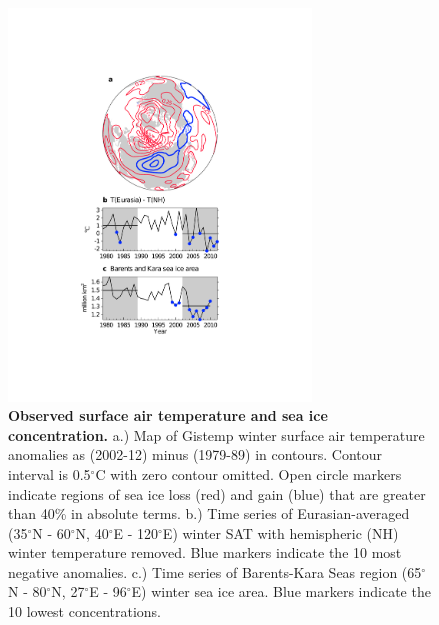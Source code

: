 \documentclass{nature}
\begin{document}
\begin{figure}%
\centering
\noindent\includegraphics[width=19pc]{Figure1.pdf}
\caption{\textbf{Observed surface air temperature and sea ice concentration.} a.) Map of Gistemp winter surface air temperature anomalies as (2002-12) minus (1979-89) in contours. Contour interval is 0.5$^\circ$C with zero contour omitted. Open circle markers indicate regions of sea ice loss (red) and gain (blue) that are greater than 40\% in absolute terms. b.) Time series of Eurasian-averaged (35$^\circ$N - 60$^\circ$N, 40$^\circ$E - 120$^\circ$E) winter SAT with hemispheric (NH) winter temperature removed. Blue markers indicate the 10 most negative anomalies. c.) Time series of Barents-Kara Seas region (65$^\circ$N - 80$^\circ$N, 27$^\circ$E - 96$^\circ$E) winter sea ice area. Blue markers indicate the 10 lowest concentrations.
}
\label{fig:fig1} 
\end{figure}
\end{document}
